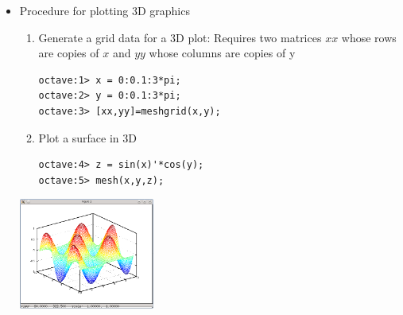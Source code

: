 \documentclass[t,compress,xcolor=svgnames]{beamer}
\begin{document}
\begin{frame}
\begin{itemize}
\begin{center}
    \end{center}
    \framebreak
    \item Procedure for plotting 3D graphics
    \begin{enumerate}
      \item Generate a grid data for a 3D plot: Requires two matrices $xx$ whose rows are copies of $x$ and $yy$ whose columns are copies of y
      \begin{verbatim}
octave:1> x = 0:0.1:3*pi;
octave:2> y = 0:0.1:3*pi;
octave:3> [xx,yy]=meshgrid(x,y);
      \end{verbatim}
    \item Plot a surface in 3D
      \begin{verbatim}
octave:4> z = sin(x)'*cos(y);
octave:5> mesh(x,y,z);
      \end{verbatim}
    \end{enumerate}
    \begin{center}
      \includegraphics[width=0.35\textwidth]{./octave-plot-3d}
    \end{center}
  \end{itemize}
\end{frame}
\end{document}

